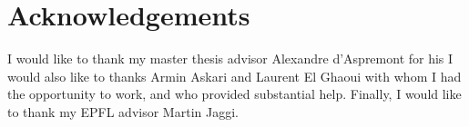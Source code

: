 \chapter*{Acknowledgements}

I would like to thank my master thesis advisor Alexandre d'Aspremont for his
I would also like to thanks Armin Askari and Laurent El Ghaoui with whom I had the opportunity to work,
and who provided substantial help.
Finally, I would like to thank my EPFL advisor Martin Jaggi.
